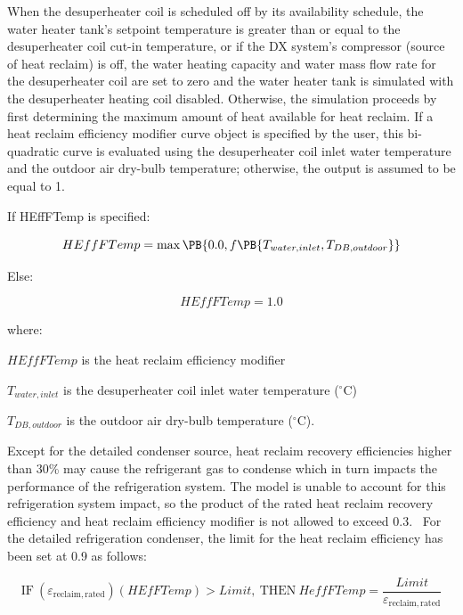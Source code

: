 When the desuperheater coil is scheduled off by its availability schedule, the water heater tank's setpoint temperature is greater than or equal to the desuperheater coil cut-in temperature, or if the DX system's compressor (source of heat reclaim) is off, the water heating capacity and water mass flow rate for the desuperheater coil are set to zero and the water heater tank is simulated with the desuperheater heating coil disabled. Otherwise, the simulation proceeds by first determining the maximum amount of heat available for heat reclaim. If a heat reclaim efficiency modifier curve object is specified by the user, this bi-quadratic curve is evaluated using the desuperheater coil inlet water temperature and the outdoor air dry-bulb temperature; otherwise, the output is assumed to be equal to 1.

If HEffFTemp is specified:

\begin{equation}
  HEffFTemp = \max\PB{0.0, f\PB{T_{water,inlet},T_{DB,outdoor}}}
\end{equation}

Else:

\begin{equation}
  HEffFTemp = 1.0
\end{equation}

where:

\(HEffFTemp\) is the heat reclaim efficiency modifier

\({T_{water,inlet}}\) is the desuperheater coil inlet water temperature (\(^{\circ}\)C)

\({T_{DB,outdoor}}\) is the outdoor air dry-bulb temperature (\(^{\circ}\)C).

Except for the detailed condenser source, heat reclaim recovery efficiencies higher than 30\% may cause the refrigerant gas to condense which in turn impacts the performance of the refrigeration system. The model is unable to account for this refrigeration system impact, so the product of the rated heat reclaim recovery efficiency and heat reclaim efficiency modifier is not allowed to exceed 0.3.~ For the detailed refrigeration condenser, the limit for the heat reclaim efficiency has been set at 0.9 as follows:

\begin{equation}
{\mathrm{IF~}}\left( {{\varepsilon_{{\mathrm{reclaim,rated}}}}} \right)\left( {HEfFTemp} \right) > Limit,{\mathrm{~THEN~}}HeffFTemp = \frac{{Limit}}{{{\varepsilon_{{\mathrm{reclaim,rated}}}}}}
\end{equation}


